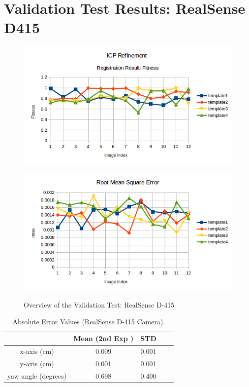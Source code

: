 \appendix
\chapter*{Validation Test Results: RealSense D415}
\label{chap:rsd415}
\begin{figure}[htp]
\begin{center}
{
  \includegraphics[clip,width=0.7\columnwidth]{figures/newreal_fitness.png}
}
\end{center}
\begin{center}
{
  \includegraphics[clip,width=0.7\columnwidth]{figures/newreal_rmse.png}
}
\end{center}
\caption{Overview of the Validation Test: RealSense D-415}
\label{newreal1}
\end{figure}



\begin{table}[ht]
\renewcommand{\arraystretch}{1.3}
\caption{Absolute Error Values (RealSense D-415 Camera).}
\label{absolute}
\centering
\begin{tabular}{|c||c||c||c||c|}
\hline
  & Mean (2nd Exp )& STD \\
\hline
x-axis (cm) & 0.009 & 0.001
 \\
\hline
y-axis (cm) & 0.001 & 0.001  \\
\hline
yaw angle (degrees)& 0.698 & 0.400 \\
\hline
\hline
\end{tabular}
\end{table}

